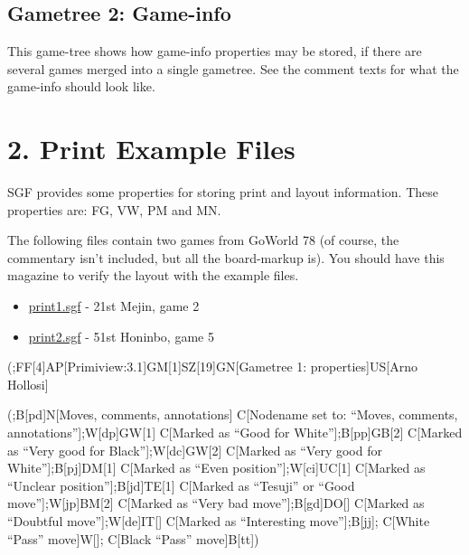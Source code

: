 \subsection{Gametree 2: Game-info}\label{gametree-2-game-info}

This game-tree shows how game-info properties may be stored, if there
are several games merged into a single gametree. See the comment texts
for what the game-info should look like.

\section{2. Print Example Files}\label{print-example-files}

SGF provides some properties for storing print and layout information.
These properties are: FG, VW, PM and MN.

The following files contain two games from GoWorld 78 (of course, the
commentary isn't included, but all the board-markup is). You should have
this magazine to verify the layout with the example files.

\begin{itemize}
\item
  \href{https://red-bean.com/sgf/examples/print1.sgf}{print1.sgf} - 21st
  Mejin, game 2
\item
  \href{https://red-bean.com/sgf/examples/print2.sgf}{print2.sgf} - 51st
  Honinbo, game 5
\end{itemize}

\newpage

(;FF{[}4{]}AP{[}Primiview:3.1{]}GM{[}1{]}SZ{[}19{]}GN{[}Gametree 1:
properties{]}US{[}Arno Hollosi{]}

(;B{[}pd{]}N{[}Moves, comments, annotations{]} C{[}Nodename set to:
``Moves, comments, annotations''{]};W{[}dp{]}GW{[}1{]} C{[}Marked as
``Good for White''{]};B{[}pp{]}GB{[}2{]} C{[}Marked as ``Very good for
Black''{]};W{[}dc{]}GW{[}2{]} C{[}Marked as ``Very good for
White''{]};B{[}pj{]}DM{[}1{]} C{[}Marked as ``Even
position''{]};W{[}ci{]}UC{[}1{]} C{[}Marked as ``Unclear
position''{]};B{[}jd{]}TE{[}1{]} C{[}Marked as ``Tesuji'' or ``Good
move''{]};W{[}jp{]}BM{[}2{]} C{[}Marked as ``Very bad
move''{]};B{[}gd{]}DO{[}{]} C{[}Marked as ``Doubtful
move''{]};W{[}de{]}IT{[}{]} C{[}Marked as ``Interesting
move''{]};B{[}jj{]}; C{[}White ``Pass'' move{]}W{[}{]}; C{[}Black
``Pass'' move{]}B{[}tt{]})

